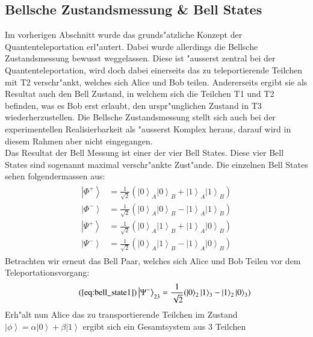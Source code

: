 \begin{refsection}
\section{Bellsche Zustandsmessung \& Bell States}
Im vorherigen Abschnitt wurde das grunds"atzliche Konzept der Quantenteleportation erl"autert. Dabei wurde allerdings die Bellsche Zustandsmessung bewusst weggelassen. Diese ist "ausserst zentral bei der Quantenteleportation, wird doch dabei einerseits das zu teleportierende Teilchen mit T2 verschr"ankt, welches sich Alice und Bob teilen. Andererseits ergibt sie als Resultat auch den Bell Zustand, in welchem sich die Teilchen T1 und T2 befinden, was es Bob erst erlaubt, den urspr"unglichen Zustand in T3 wiederherzustellen. Die Bellsche Zustandsmessung stellt sich auch bei der experimentellen Realisierbarkeit als "ausserst Komplex heraus, darauf wird in diesem Rahmen aber nicht eingegangen.
\\
Das Resultat der Bell Messung ist einer der vier Bell States. Diese vier Bell States sind sogenannt maximal verschr"ankte Zust"ande. Die einzelnen Bell States sehen folgendermassen aus:
\begin{align}
	\begin{split}
\left|\Phi^+\right\rangle & = \frac{1}{\sqrt{2}}(\left|0\right\rangle_{A}\left|0\right\rangle_{B} + \left|1\right\rangle_{A}\left|1\right\rangle_{B}) \\
\left|\Phi^-\right\rangle & = \frac{1}{\sqrt{2}}(\left|0\right\rangle_{A}\left|0\right\rangle_{B} - \left|1\right\rangle_{A}\left|1\right\rangle_{B}) \\
\left|\Psi^+\right\rangle & = \frac{1}{\sqrt{2}}(\left|0\right\rangle_{A}\left|1\right\rangle_{B} + \left|1\right\rangle_{A}\left|0\right\rangle_{B}) \\
\left|\Psi^-\right\rangle & = \frac{1}{\sqrt{2}}(\left|0\right\rangle_{A}\left|1\right\rangle_{B} - \left|1\right\rangle_{A}\left|0\right\rangle_{B}) 
	\end{split}
\end{align}
Betrachten wir erneut das Bell Paar, welches sich Alice und Bob Teilen vor dem Teleportationsvorgang:
\begin{align}  \tag{\ref{eq:bell_state1}}
 \left|\Psi^{-}\right\rangle_{23} = \frac{1}{\sqrt{2}} ( \left|0\right\rangle_{2}\left|1\right\rangle_{3} - \left|1\right\rangle_{2}\left|0\right\rangle_{3} )
\end{align}
Erh"alt nun Alice das zu transportierende Teilchen im Zustand $\left|\phi\right\rangle = \alpha\left|0\right\rangle + \beta\left|1\right\rangle$ ergibt sich ein Gesamtsystem aus 3 Teilchen

\end{refsection}
